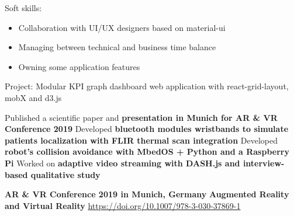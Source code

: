 \documentclass[11pt,a4paper,ragged2e,withhyper]{altacv}
\begin{document}
\bigskip
Soft skills:
\begin{itemize}
  \item Collaboration with UI/UX designers based on material-ui
  \item Managing between technical and business time balance
  \item Owning some application features
\end{itemize}
\divider

Project: Modular KPI graph dashboard web application with react-grid-layout, mobX and d3.js

\newpage
{}
\begin{paracol}{2}

Published a scientific paper and \textbf{presentation in Munich for AR \& VR Conference 2019}
\smallbreak
\divider
{}
Developed \textbf{bluetooth modules wristbands to simulate patients localization with FLIR thermal scan integration}
\smallbreak
\divider
{}
Developed \textbf{robot's collision avoidance with MbedOS + Python and a Raspberry Pi}
\smallbreak
\divider
{}
Worked on \textbf{adaptive video streaming with DASH.js and interview-based qualitative study}

\medskip
{}
\smallbreak
\textbf{AR \& VR Conference 2019 in Munich, Germany}
\smallbreak
\smallbreak
{}
\smallbreak
\textbf{Augmented Reality and Virtual Reality}
\smallbreak
\url{https://doi.org/10.1007/978-3-030-37869-1}
\medskip



\end{paracol}
\end{document}
